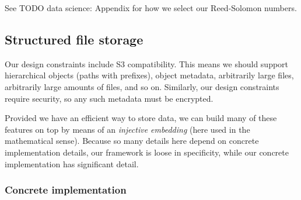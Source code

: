 \documentclass[a4paper,10pt]{article} \usepackage[utf8]{inputenc}
\newcommand{\todo}[1]{{\color{red} TODO #1}}
\begin{document}
See \todo{data science: Appendix} for how we select our Reed-Solomon numbers.

\subsection{Structured file storage}

Our design constraints include S3 compatibility. This means we should support
hierarchical objects (paths with prefixes), object metadata, arbitrarily large
files, arbitrarily large amounts of files, and so on. Similarly, our design
constraints require security, so any such metadata must be encrypted.

Provided we have an efficient way to store data, we can build many of these
features on top by means of an {\em injective embedding} (here used in the
mathematical sense). Because so many details here depend on concrete
implementation details, our framework is loose in specificity, while our
concrete implementation has significant detail.

\subsubsection{Concrete implementation}
\end{document}
